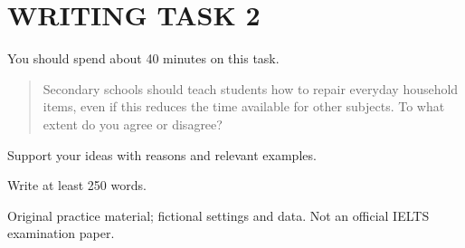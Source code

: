 \section*{WRITING TASK 2}
You should spend about 40 minutes on this task.

\begin{quote}\large Secondary schools should teach students how to repair everyday household items, even if this reduces the time available for other subjects. To what extent do you agree or disagree?
\end{quote}
Support your ideas with reasons and relevant examples.

Write at least 250 words.
\par\bigskip
{\footnotesize\color{gray} Original practice material; fictional settings and data. Not an official IELTS examination paper.}
